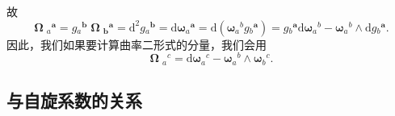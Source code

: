 故
\begin{equation*}
	\boldsymbol{\upOmega}{_{a}}^{\boldsymbol{a}} =g{_{a}}^{\boldsymbol{b}}\boldsymbol{\upOmega}{_{\boldsymbol{b}}}^{\boldsymbol{a}} =\mathrm{d}^{2} g{_{a}}^{\boldsymbol{b}} =\mathrm{d}\boldsymbol{\omega}{_{a}}^{\boldsymbol{a}} =\mathrm{d} (\boldsymbol{\omega}{_{a}}^{b} g{_{b}}^{\boldsymbol{a}} )=g{_{b}}^{\boldsymbol{a}}\mathrm{d}\boldsymbol{\omega}{_{a}}^{b} -\boldsymbol{\omega}{_{a}}^{b} \land \mathrm{d} g{_{b}}^{\boldsymbol{a}} .
\end{equation*}
因此，我们如果要计算曲率二形式的分量，我们会用
\begin{equation}
	\boldsymbol{\upOmega}{_{a}}^{c} =\mathrm{d}\boldsymbol{\omega}{_{a}}^{c} -\boldsymbol{\omega}{_{a}}^{b} \land \boldsymbol{\omega}{_{b}}^{c} .
	\label{eq:5.88}
\end{equation}

\subsection{与自旋系数的关系}

